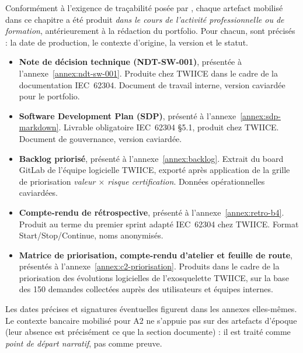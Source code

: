 \begin{tcolorbox}[enhanced, breakable, colback=green!5, colframe=green!45!black, boxrule=0.5pt, arc=4pt,
  left=10pt, right=10pt, top=8pt, bottom=8pt,
  title={\textbf{\small Encart d'authenticité des artefacts mobilisés}},
  fonttitle=\small\bfseries, coltitle=white, attach boxed title to top left={yshift=-2mm, xshift=4mm},
  boxed title style={colback=green!45!black, arc=3pt, boxrule=0pt}]
\small
Conformément à l'exigence de traçabilité posée par \citet{tardif2006}, chaque artefact mobilisé dans ce chapitre a été produit \emph{dans le cours de l'activité professionnelle ou de formation}, antérieurement à la rédaction du portfolio. Pour chacun, sont précisés : la date de production, le contexte d'origine, la version et le statut.

\begin{itemize}
  \item \textbf{Note de décision technique (NDT-SW-001)}, présentée à l'annexe~\ref{annex:ndt-sw-001}. Produite chez TWIICE dans le cadre de la documentation IEC~62304. Document de travail interne, version caviardée pour le portfolio.
  \item \textbf{Software Development Plan (SDP)}, présenté à l'annexe~\ref{annex:sdp-markdown}. Livrable obligatoire IEC~62304 §5.1, produit chez TWIICE. Document de gouvernance, version caviardée.
  \item \textbf{Backlog priorisé}, présenté à l'annexe~\ref{annex:backlog}. Extrait du board GitLab de l'équipe logicielle TWIICE, exporté après application de la grille de priorisation \emph{valeur $\times$ risque certification}. Données opérationnelles caviardées.
  \item \textbf{Compte-rendu de rétrospective}, présenté à l'annexe~\ref{annex:retro-b4}. Produit au terme du premier sprint adapté IEC~62304 chez TWIICE. Format Start/Stop/Continue, noms anonymisés.
  \item \textbf{Matrice de priorisation, compte-rendu d'atelier et feuille de route}, présentés à l'annexe~\ref{annex:c2-priorisation}. Produits dans le cadre de la priorisation des évolutions logicielles de l'exosquelette TWIICE, sur la base des 150 demandes collectées auprès des utilisateurs et équipes internes.
\end{itemize}

Les dates précises et signatures éventuelles figurent dans les annexes elles-mêmes. Le contexte bancaire mobilisé pour A2 ne s'appuie pas sur des artefacts d'époque (leur absence est précisément ce que la section documente) : il est traité comme \emph{point de départ narratif}, pas comme preuve.
\end{tcolorbox}

